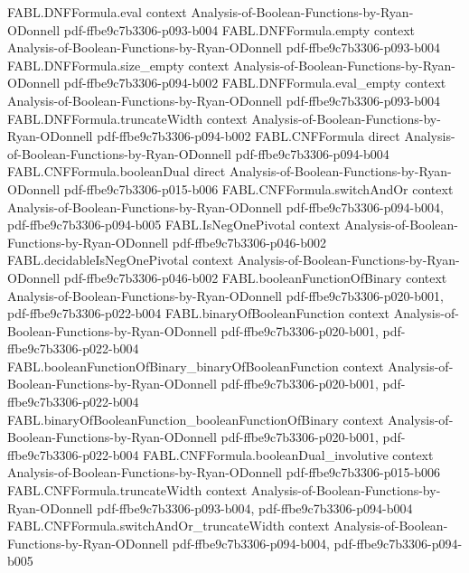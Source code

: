 \begin{theorem}
\proofstep
  {FABL.DNFFormula.eval}
  {context}
  {Analysis-of-Boolean-Functions-by-Ryan-ODonnell}
  {pdf-ffbe9c7b3306-p093-b004}
\proofstep
  {FABL.DNFFormula.empty}
  {context}
  {Analysis-of-Boolean-Functions-by-Ryan-ODonnell}
  {pdf-ffbe9c7b3306-p093-b004}
\proofstep
  {FABL.DNFFormula.size_empty}
  {context}
  {Analysis-of-Boolean-Functions-by-Ryan-ODonnell}
  {pdf-ffbe9c7b3306-p094-b002}
\proofstep
  {FABL.DNFFormula.eval_empty}
  {context}
  {Analysis-of-Boolean-Functions-by-Ryan-ODonnell}
  {pdf-ffbe9c7b3306-p093-b004}
\proofstep
  {FABL.DNFFormula.truncateWidth}
  {context}
  {Analysis-of-Boolean-Functions-by-Ryan-ODonnell}
  {pdf-ffbe9c7b3306-p094-b002}
\proofstep
  {FABL.CNFFormula}
  {direct}
  {Analysis-of-Boolean-Functions-by-Ryan-ODonnell}
  {pdf-ffbe9c7b3306-p094-b004}
\proofstep
  {FABL.CNFFormula.booleanDual}
  {direct}
  {Analysis-of-Boolean-Functions-by-Ryan-ODonnell}
  {pdf-ffbe9c7b3306-p015-b006}
\proofstep
  {FABL.CNFFormula.switchAndOr}
  {context}
  {Analysis-of-Boolean-Functions-by-Ryan-ODonnell}
  {pdf-ffbe9c7b3306-p094-b004,
    pdf-ffbe9c7b3306-p094-b005}
\proofstep
  {FABL.IsNegOnePivotal}
  {context}
  {Analysis-of-Boolean-Functions-by-Ryan-ODonnell}
  {pdf-ffbe9c7b3306-p046-b002}
\proofstep
  {FABL.decidableIsNegOnePivotal}
  {context}
  {Analysis-of-Boolean-Functions-by-Ryan-ODonnell}
  {pdf-ffbe9c7b3306-p046-b002}
\proofstep
  {FABL.booleanFunctionOfBinary}
  {context}
  {Analysis-of-Boolean-Functions-by-Ryan-ODonnell}
  {pdf-ffbe9c7b3306-p020-b001,
    pdf-ffbe9c7b3306-p022-b004}
\proofstep
  {FABL.binaryOfBooleanFunction}
  {context}
  {Analysis-of-Boolean-Functions-by-Ryan-ODonnell}
  {pdf-ffbe9c7b3306-p020-b001,
    pdf-ffbe9c7b3306-p022-b004}
\proofstep
  {FABL.booleanFunctionOfBinary_binaryOfBooleanFunction}
  {context}
  {Analysis-of-Boolean-Functions-by-Ryan-ODonnell}
  {pdf-ffbe9c7b3306-p020-b001,
    pdf-ffbe9c7b3306-p022-b004}
\proofstep
  {FABL.binaryOfBooleanFunction_booleanFunctionOfBinary}
  {context}
  {Analysis-of-Boolean-Functions-by-Ryan-ODonnell}
  {pdf-ffbe9c7b3306-p020-b001,
    pdf-ffbe9c7b3306-p022-b004}
\proofstep
  {FABL.CNFFormula.booleanDual_involutive}
  {context}
  {Analysis-of-Boolean-Functions-by-Ryan-ODonnell}
  {pdf-ffbe9c7b3306-p015-b006}
\proofstep
  {FABL.CNFFormula.truncateWidth}
  {context}
  {Analysis-of-Boolean-Functions-by-Ryan-ODonnell}
  {pdf-ffbe9c7b3306-p093-b004,
    pdf-ffbe9c7b3306-p094-b004}
\proofstep
  {FABL.CNFFormula.switchAndOr_truncateWidth}
  {context}
  {Analysis-of-Boolean-Functions-by-Ryan-ODonnell}
  {pdf-ffbe9c7b3306-p094-b004,
    pdf-ffbe9c7b3306-p094-b005}

\end{theorem}
